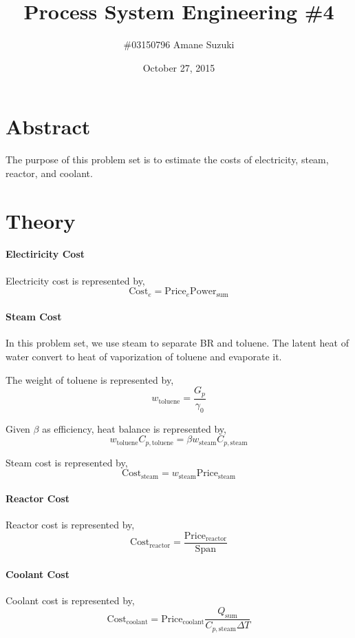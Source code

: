 \documentclass[a4paper,titlepage]{article}
\newcommand{\Cost}{\mathrm{Cost}}
\newcommand{\Price}{\mathrm{Price}}
\newcommand{\Power}{\mathrm{Power}}
\newcommand{\toluene}{\mathrm{toluene}}
\newcommand{\coolant}{\mathrm{coolant}}
\newcommand{\steam}{\mathrm{steam}}
\newcommand{\reactor}{\mathrm{reactor}}
\begin{document}
  \title{Process System Engineering \#4}
  \author{\#03150796 Amane Suzuki}
  \date{October 27, 2015}
  \maketitle

  \section{Abstract}
  The purpose of this problem set is to estimate the costs of electricity, steam, reactor, and coolant.

  \section{Theory}
  \paragraph{Electiricity Cost}
  Electricity cost is represented by,
  \[
    \Cost_e = \Price_e \Power_{\mathrm{sum}}
  \]

  \paragraph{Steam Cost}
  In this problem set, we use steam to separate BR and toluene.
  The latent heat of water convert to heat of vaporization of toluene and evaporate it.

  The weight of toluene is represented by,
  \[
    w_{\toluene} = \frac{G_p}{\gamma_0}
  \]

  Given $\beta$ as efficiency, heat balance is represented by,
  \[
    w_{\toluene} C_{p, \toluene}  = \beta w_{\steam} C_{p, \steam}
  \]

  Steam cost is represented by,
  \[
    \Cost_{\steam} = w_{\steam} \Price_\steam
  \]

  \paragraph{Reactor Cost}
  Reactor cost is represented by,
  \[
    \Cost_{\reactor} = \frac{\Price_{\reactor}}{\mathrm{Span}}
  \]

  \paragraph{Coolant Cost}
  Coolant cost is represented by,
  \[
    \Cost_{\coolant} = \Price_\coolant \frac{Q_\mathrm{sum}}{C_{p, \steam} \Delta T}
  \]
\end{document}
